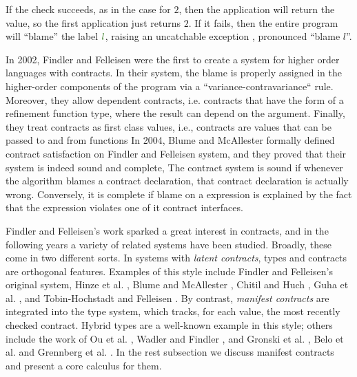 If the check succeeds, as in the case for $2$,
then the application will return the value, so the first 
application just returns $2$.
If it fails, then the entire program will ``blame'' the label $\mklabel{l}$,
raising an uncatchable exception  , pronounced ``blame $l$''.

\begin{comment}
Assigning blame for contractual violations in higher-order languages
is complex:
%
The boundaries between cooperating components are more obscure 
than in the world with only first-order functions. 
A function may invoke a function passed to it at its call side.
Accordingly, the blame for a corresponding contract violation must 
lie with the supplier of the bad value, 
no matter if the bad value was passed by directly applying 
a function or by applying a base value.
%
\end{comment}
In 2002, Findler and Felleisen \cite{Findler02} were the first to
create a system for higher order languages with contracts.
%
In their system, the blame is properly assigned in the 
higher-order components of the program via a
``variance-contravariance`` rule.
Moreover,
they allow dependent contracts, i.e. 
contracts that have the form of a refinement function type, 
where the result can depend on the argument.
Finally,
they treat contracts as first class values, 
i.e., contracts are values that can be passed to and from functions
%
In 2004, Blume and McAllester \cite{BlumeM06} 
formally defined contract satisfaction on Findler and Felleisen system,
and they proved that their system is indeed
sound and complete, 
%
The contract system is sound if whenever
the algorithm blames a contract declaration, 
that contract declaration is actually wrong.
%
Conversely, it is complete if blame on a expression is explained
by the fact that the expression violates one of it contract interfaces.

Findler and Felleisen's work sparked a great interest
in contracts, and in the following years a variety
of related systems have been studied. 
Broadly, these come in two different sorts. 
%
In systems with \textit{latent contracts}, types and contracts
are orthogonal features. Examples of this style include Findler
and Felleisen's original system, Hinze et al. \cite{Hinze06}, Blume and
McAllester \cite{BlumeM06}, Chitil and Huch \cite{ChitilH07}, Guha et al. \cite{GuhaMFK07},
and Tobin-Hochstadt and Felleisen \cite{Tobin-HochstadtF08}. 
By contrast, \textit{manifest contracts} are integrated into the type system, 
which tracks, for each value, the most recently checked contract. 
Hybrid types \cite{flanagan06} are a well-known example in this style; others include the
work of Ou et al. \cite{Ou2004}, Wadler and Findler \cite{WadlerF09}, and Gronski
et al. \cite{Gronski06}, Belo et al. \cite{Greenberg11} and Grennberg et al. \cite{Greenberg12}.
%
In the rest subsection we discuss manifest contracts and
present a core calculus for them.

